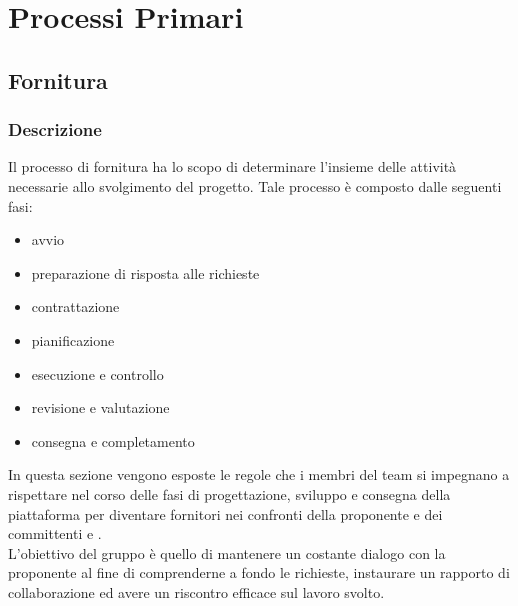 \section{Processi Primari}
    \subsection{Fornitura}
        \subsubsection{Descrizione}
        Il processo di fornitura ha lo scopo di determinare l'insieme delle attività necessarie allo svolgimento del progetto. Tale processo è composto dalle seguenti fasi:
        \begin{itemize}
            \item{avvio}
            \item{preparazione di risposta alle richieste}
            \item{contrattazione}
            \item{pianificazione}
            \item{esecuzione e controllo}
            \item{revisione e valutazione}
            \item{consegna e completamento}
        \end{itemize}
         In questa sezione vengono esposte le regole che i membri del team \Gruppo{} si impegnano a rispettare nel corso delle fasi di progettazione, sviluppo e consegna della piattaforma \NomeProgetto{} per diventare fornitori nei confronti della proponente \Proponente{} e dei committenti \TV{} e \RC{}. \\
         L'obiettivo del gruppo è quello di mantenere un costante dialogo con la proponente al fine di comprenderne a fondo le richieste, instaurare un rapporto di collaborazione ed avere un riscontro efficace sul lavoro svolto.
        
